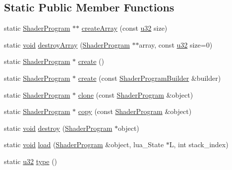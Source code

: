 \subsection*{Static Public Member Functions}
\begin{DoxyCompactItemize}
\item 
static \mbox{\hyperlink{classnjli_1_1_shader_program}{Shader\+Program}} $\ast$$\ast$ \mbox{\hyperlink{classnjli_1_1_shader_program_a78a8831d8b2c160381b3f00b5bd0a9f1}{create\+Array}} (const \mbox{\hyperlink{_util_8h_a10e94b422ef0c20dcdec20d31a1f5049}{u32}} size)
\item 
static \mbox{\hyperlink{_thread_8h_af1e856da2e658414cb2456cb6f7ebc66}{void}} \mbox{\hyperlink{classnjli_1_1_shader_program_a86ca7eb980e28330ee6ca6a7d17e0a12}{destroy\+Array}} (\mbox{\hyperlink{classnjli_1_1_shader_program}{Shader\+Program}} $\ast$$\ast$array, const \mbox{\hyperlink{_util_8h_a10e94b422ef0c20dcdec20d31a1f5049}{u32}} size=0)
\item 
static \mbox{\hyperlink{classnjli_1_1_shader_program}{Shader\+Program}} $\ast$ \mbox{\hyperlink{classnjli_1_1_shader_program_a0d6c86874feb9ca5e1203afe5c30b216}{create}} ()
\item 
static \mbox{\hyperlink{classnjli_1_1_shader_program}{Shader\+Program}} $\ast$ \mbox{\hyperlink{classnjli_1_1_shader_program_a425842368a91fb2d82d550a36d3d440a}{create}} (const \mbox{\hyperlink{classnjli_1_1_shader_program_builder}{Shader\+Program\+Builder}} \&builder)
\item 
static \mbox{\hyperlink{classnjli_1_1_shader_program}{Shader\+Program}} $\ast$ \mbox{\hyperlink{classnjli_1_1_shader_program_a65c36d0386ef8a58f55d14918d0d8096}{clone}} (const \mbox{\hyperlink{classnjli_1_1_shader_program}{Shader\+Program}} \&object)
\item 
static \mbox{\hyperlink{classnjli_1_1_shader_program}{Shader\+Program}} $\ast$ \mbox{\hyperlink{classnjli_1_1_shader_program_ac5ccaeffeccdfc14a2579eddb07e0a36}{copy}} (const \mbox{\hyperlink{classnjli_1_1_shader_program}{Shader\+Program}} \&object)
\item 
static \mbox{\hyperlink{_thread_8h_af1e856da2e658414cb2456cb6f7ebc66}{void}} \mbox{\hyperlink{classnjli_1_1_shader_program_ae162b5b68d88e47b14b507fec798da1c}{destroy}} (\mbox{\hyperlink{classnjli_1_1_shader_program}{Shader\+Program}} $\ast$object)
\item 
static \mbox{\hyperlink{_thread_8h_af1e856da2e658414cb2456cb6f7ebc66}{void}} \mbox{\hyperlink{classnjli_1_1_shader_program_af1b37f6cb592d8ebd4f5a31a80a373c2}{load}} (\mbox{\hyperlink{classnjli_1_1_shader_program}{Shader\+Program}} \&object, lua\+\_\+\+State $\ast$L, int stack\+\_\+index)
\item 
static \mbox{\hyperlink{_util_8h_a10e94b422ef0c20dcdec20d31a1f5049}{u32}} \mbox{\hyperlink{classnjli_1_1_shader_program_a92e24de59f2e44318baab955895910ba}{type}} ()
\end{DoxyCompactItemize}
